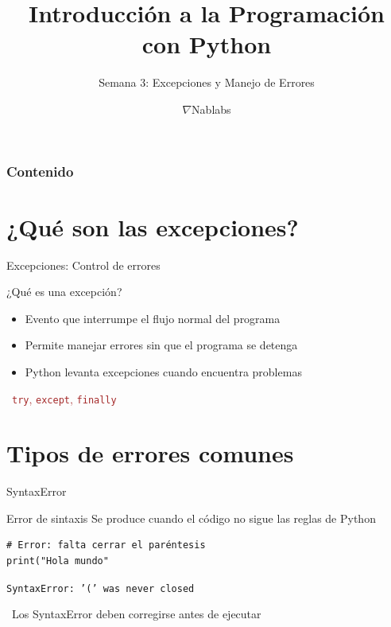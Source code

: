 \documentclass{beamer}
\title{\textbf{Introducción a la Programación con Python}}
\subtitle{Semana 3: Excepciones y Manejo de Errores}
\author{$\nabla$Nablabs}
\date{}
\begin{document}
\begin{frame}
\titlepage
\end{frame}

\begin{frame}
\frametitle{Contenido}
\tableofcontents
\end{frame}

\section{¿Qué son las excepciones?}

\begin{frame}{Excepciones: Control de errores \faExclamationTriangle}
\begin{conceptbox}{¿Qué es una excepción?}
\small
\begin{itemize}
    \item[\faBug] Evento que interrumpe el flujo normal del programa
    \item[\faShieldAlt] Permite manejar errores sin que el programa se detenga
    \item[\faCode] Python levanta excepciones cuando encuentra problemas
\end{itemize}
\end{conceptbox}

\vspace{0.2cm}
\begin{center}
\large\textcolor{brown}{\faCogs\ \texttt{try}, \texttt{except}, \texttt{finally}}
\end{center}
\end{frame}

\section{Tipos de errores comunes}

\begin{frame}[fragile]{SyntaxError \faTimesCircle}
\begin{conceptbox}{Error de sintaxis}
Se produce cuando el código no sigue las reglas de Python
\end{conceptbox}

\begin{lstlisting}
# Error: falta cerrar el paréntesis
print("Hola mundo"
\end{lstlisting}

\vspace{-0.2cm}
\begin{tcolorbox}[colback=red!10,colframe=red,title={\small\faExclamationTriangle \ Error},coltitle=fg0,left=3pt,right=3pt,top=2pt,bottom=2pt,boxsep=1pt]
\small\texttt{SyntaxError: '(' was never closed}
\end{tcolorbox}

\vspace{-0.1cm}
\begin{notebox}
\small\faInfoCircle\ Los SyntaxError deben corregirse antes de ejecutar
\end{notebox}
\end{frame}
\end{document}
